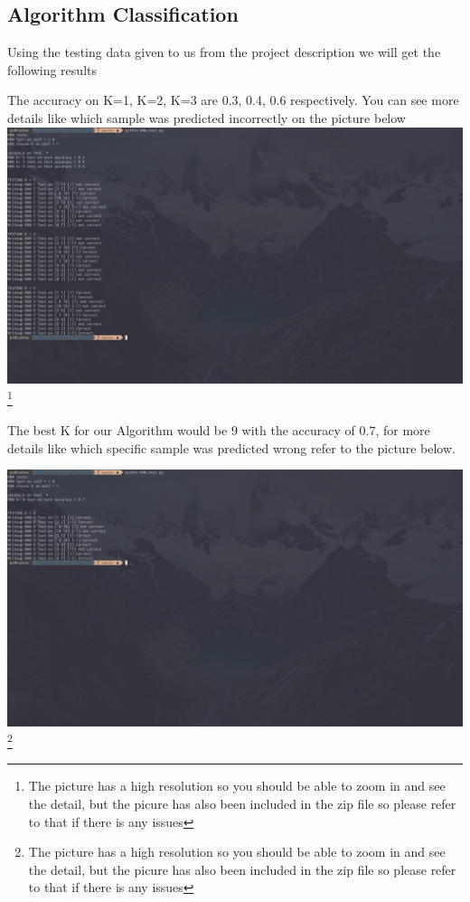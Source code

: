 \documentclass{article}
\begin{document}
	\subsection{Algorithm Classification}
	
	Using the testing data given to us from the project description we will get the following results 
\begin{center}
The accuracy on K=1, K=2, K=3 are 0.3, 0.4, 0.6 respectively. You can see more details like which sample was predicted incorrectly on the picture below 
\includegraphics[scale=.24]{KNN.jpg}
	\footnote{The picture has a high resolution so you should be able to zoom in and see the detail, but the picure has also been included in the zip file so please refer to that if there is any issues}
	
\end{center}
	The best K for our Algorithm would be 9 with the accuracy of 0.7, for more details like which specific sample was predicted wrong refer to the picture below.
	\begin{center}
		\includegraphics[scale=.24]{KNN2.jpg}
		\footnote{The picture has a high resolution so you should be able to zoom in and see the detail, but the picure has also been included in the zip file so please refer to that if there is any issues}
		
	\end{center}
\end{document}
